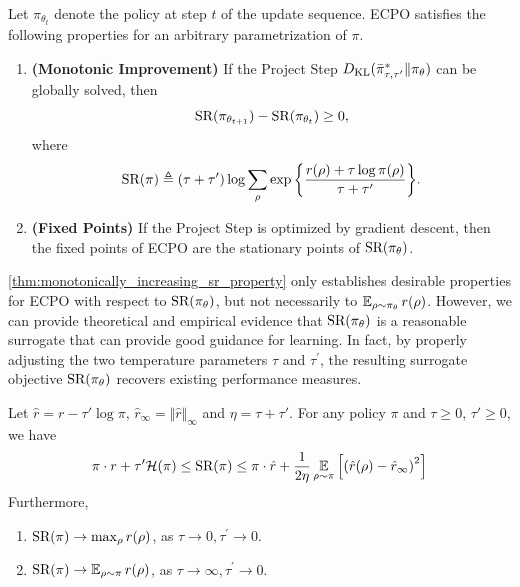 \begin{thm}
\label{thm:monotonically_increasing_sr_property}
Let $\pi_{\theta_{t}}$ denote the policy at step $t$ of the update
sequence.
ECPO satisfies the following properties for an arbitrary parametrization of $\pi$.
\begin{enumerate}
	\item {\bf (Monotonic Improvement)} 
	If the Project Step $D_{\mathrm{KL}}( \bar{\pi}_{\tau,\tau^{\prime}}^* \| \pi_\theta )$ can be globally solved,
then 
	\begin{equation*}
	\text{SR}(\pi_{\theta_{t+1}}) - \text{SR}(\pi_{\theta_t})\ge 0,
	\end{equation*}
	where
	{\small
	\begin{equation}
	\label{eq:SR}
	\text{SR}(\pi) \triangleq (\tau + \tau^{\prime})\log{ \sum_{\rho}{ \exp\left\{ \frac{r(\rho) + \tau \log{\pi(\rho)} }{\tau + \tau^{\prime}} \right\} }}.
	\end{equation}
	}
	\item {\bf (Fixed Points)} If the Project Step is optimized by gradient descent, then the fixed points of ECPO are the 
	stationary points of $\text{SR}(\pi_\theta)$. 
\end{enumerate}
\end{thm}
\noindent \cref{thm:monotonically_increasing_sr_property} only establishes
desirable properties for ECPO with respect to $\text{SR}(\pi_\theta)$,
but not necessarily to $\operatorname*{\mathbb{E}}_{\rho\sim \pi_\theta}{r(\rho)}$. However, we can provide
theoretical and empirical evidence that
$\text{SR}(\pi_\theta)$ is a reasonable surrogate 
that can provide good guidance for learning.
In fact, by properly adjusting the two temperature parameters $\tau$ and
$\tau^{\prime}$,
the resulting surrogate objective $\text{SR}(\pi_\theta)$
recovers existing performance measures.

\begin{lem}
\label{lem:sr}
Let $\hat{r}=r-\tau' \log\pi$, $\hat{r}_\infty = \Vert \hat{r} \Vert_\infty$ and $\eta = \tau+\tau'$. For any policy $\pi$ and $\tau\geq 0$, $\tau'\geq 0$, we have
\begin{align*}
\pi\cdot r + \tau' \mathcal{H}(\pi) \leq \text{SR}(\pi) \leq  \pi\cdot \hat{r} + \frac{1}{2\eta} \operatorname*{\mathbb{E}}_{\rho\sim \pi}{\left[\left( \hat{r}(\rho) - \hat{r}_\infty \right)^2 \right]}
\end{align*}
Furthermore, 
\begin{enumerate}[label=(\roman*)]
	\item  $\text{SR}(\pi) \to \max_{\rho}{r(\rho)}$, as $\tau \to 0, \tau^{\prime} \to 0$.
	\item $\text{SR}(\pi) \to \operatorname*{\mathbb{E}}_{\rho \sim \pi}{r(\rho)}$, as $\tau \to \infty, \tau^{\prime} \to 0$. 
\end{enumerate}
\end{lem}

